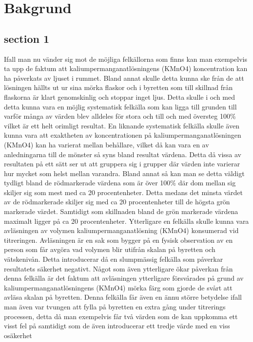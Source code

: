 \chapter{Bakgrund}

\section{section 1}
Ifall man nu vänder sig mot de möjliga felkällorna som finns kan man exempelvis ta upp de faktum
att kaliumpermanganatlösningens (KMnO4) koncentration kan ha påverkats av ljuset i rummet.
Bland annat skulle detta kunna ske från de att lösningen hällts ut ur sina mörka flaskor och i byretten
som till skillnad från flaskorna är klart genomskinlig och stoppar inget ljus. Detta skulle i och med
detta kunna vara en möjlig systematisk felkälla som kan ligga till grunden till varför många av
värden blev alldeles för stora och till och med översteg 100\% vilket är ett helt orimligt resultat.
En liknande systematisk felkälla skulle även kunna vara att exaktheten av koncentrationen på
kaliumpermanganatlösningen (KMnO4) kan ha varierat mellan behållare, vilket då kan vara en av
anledningarna till de mönster så syns bland resultat värdena. Detta då vissa av resultaten på ett sätt
ser ut att gruppera sig i grupper där värden inte varierar hur mycket som helst mellan varandra.
Bland annat så kan man se detta väldigt tydligt bland de rödmarkerade värdena som är över 100\%
där dom mellan sig skiljer sig som mest med ca 20 procentenheter. Detta medans det minsta värdet
av de rödmarkerade skiljer sig med ca 20 procentenheter till de högsta grön markerade värdet.
Samtidigt som skillnaden bland de grön markerade värdena maximalt ligger på ca 20 procentenheter.
Ytterligare en felkälla skulle kunna vara avläsningen av volymen kaliumpermanganatlösning
(KMnO4) konsumerad vid titreringen. Avläsningen är en sak som bygger på en fysisk observation av
en person som får avgöra vad volymen blir utifrån skalan på byretten och vätskenivån. Detta
introducerar då en slumpmässig felkälla som påverkar resultatets säkerhet negativt. Något som även
ytterligare ökar påverkan från denna felkälla är det faktum att avläsningen ytterligare försvårades på
grund av kaliumpermanganatlösningens (KMnO4) mörka färg som gjorde de svårt att avläsa skalan
på byretten. Denna felkälla får även en ännu större betydelse ifall man även var tvungen att fylla på
byretten en extra gång under titrerings processen, detta då man exempelvis får två värden som de kan
uppkomma ett visst fel på samtidigt som de även introducerar ett tredje värde med en viss osäkerhet
